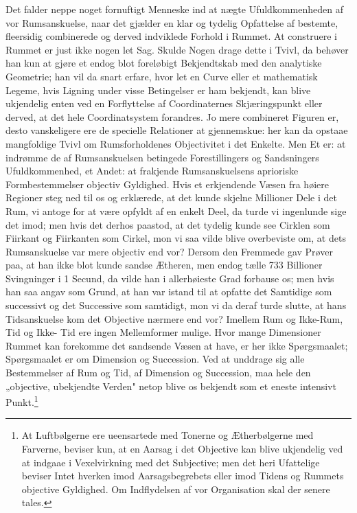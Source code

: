 \documentclass[12pt]{article}
\newcommand{\opage}[1]{\marginnote{\footnotesize\textit{[#1]}}}
\begin{document}
Det falder neppe noget fornuftigt Menneske ind at nægte
Ufuldkommenheden af vor Rumsanskuelse, naar det gjælder
en klar og tydelig Opfattelse af bestemte, fleersidig combinerede
og derved indviklede Forhold i Rummet. At construere i Rum\-met
er just ikke nogen let Sag. Skulde Nogen drage dette i
Tvivl, da behøver han kun at gjøre et endog blot foreløbigt
Bekjendtskab med den analytiske Geometrie; han vil da snart
erfare, hvor let en Curve eller et mathematisk Legeme, hvis
Ligning under visse Betingelser er ham bekjendt, kan blive
ukjendelig enten ved en Forflyttelse af Coordinaternes Skjæ\-ringspunkt
eller derved, at det hele Coordinatsystem forandres.
Jo mere combineret Figuren er, desto vanskeligere ere de
specielle Relationer at gjennemskue: her kan da opstaae
mangfoldige Tvivl om Rumsforholdenes Objectivitet i det Enkelte.
Men Et er: at indrømme de af Rumsanskuelsen betingede
Forestillingers og Sandsningers Ufuldkommenhed, et Andet: at
frakjende Rumsanskuelsens aprioriske Formbestemmelser objectiv
Gyldighed. Hvis et erkjendende Væsen fra høiere Regioner
steg ned til os og erklærede, at det kunde skjelne Millioner
Dele i det Rum, vi antoge for at være opfyldt af en enkelt Deel,
da turde vi ingenlunde sige det imod; men hvis det derhos
paastod, at det tydelig kunde see Cirklen som Fiirkant og
Fiirkanten som Cirkel, mon vi saa vilde blive overbeviste om, at
dets Rumsanskuelse var mere objectiv end vor? Dersom den
Fremmede gav Prøver paa, at han ikke blot kunde sandse
Ætheren, men endog tælle 733 Billioner Svingninger i 1 Secund,
da vilde han i allerhøieste Grad forbause os; men hvis han saa
angav som Grund, at han var istand til at opfatte det
Samtidige som successivt og det Successive som samtidigt, mon vi
da deraf turde slutte, at hans Tidsanskuelse kom det Objective
nærmere end vor? Imellem Rum og Ikke-Rum, Tid og Ikke-%
\opage{15}Tid ere ingen Mellemformer mulige. Hvor mange Dimensioner
Rummet kan forekomme det sandsende Væsen at have, er her
ikke Spørgsmaalet; Spørgsmaalet er om Dimension og Succession.
Ved at unddrage sig alle Bestemmelser af Rum og Tid, af
Dimension og Succession, maa hele den „objective, ubekjendte
Verden" netop blive os bekjendt som et eneste intensivt
Punkt.\footnote{At Luftbølgerne ere ueensartede med Tonerne og
Ætherbølgerne med Farverne, beviser kun, at en Aarsag i det Objective
kan blive ukjendelig ved at indgaae i Vexelvirkning med det Subjective;
men det heri Ufattelige beviser Intet hverken imod Aarsagsbegrebets eller
imod Tidens og Rummets objective Gyldighed. Om Indflydelsen af vor
Organisation skal der senere tales.}
\end{document}
